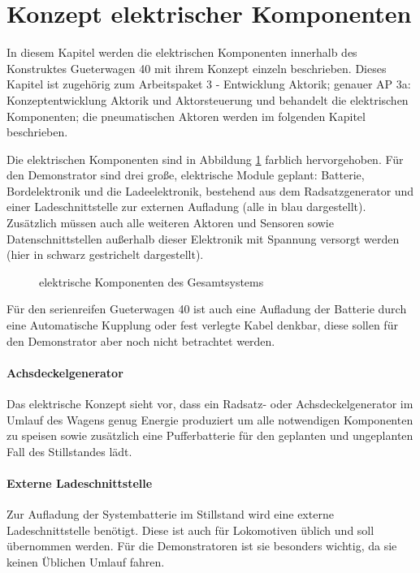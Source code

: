 \section{Konzept elektrischer Komponenten}\label{sec:eKomp}
In diesem Kapitel werden die elektrischen Komponenten innerhalb des Konstruktes \gls{Gueterwagen 40} mit ihrem Konzept einzeln beschrieben. Dieses Kapitel ist zugehörig zum Arbeitspaket 3 - Entwicklung Aktorik; genauer AP 3a: Konzeptentwicklung Aktorik und Aktorsteuerung und behandelt die elektrischen Komponenten; die pneumatischen Aktoren werden im folgenden Kapitel beschrieben.\par
Die elektrischen Komponenten sind in Abbildung \ref{fig:eKomp} farblich hervorgehoben.
Für den \gls{Demonstrator} sind drei große, elektrische Module geplant: Batterie, Bordelektronik und die Ladeelektronik, bestehend aus dem Radsatzgenerator und einer Ladeschnittstelle zur externen Aufladung (alle in blau dargestellt). Zusätzlich müssen auch alle weiteren Aktoren und Sensoren sowie Datenschnittstellen außerhalb dieser Elektronik mit Spannung versorgt werden (hier in schwarz gestrichelt dargestellt).\par
\begin{figure}[hbt]
    \centering
    
    \caption{elektrische Komponenten des Gesamtsystems}
    \label{fig:eKomp}
\end{figure}
Für den serienreifen \gls{Gueterwagen 40} ist auch eine Aufladung der Batterie durch eine Automatische Kupplung oder fest verlegte Kabel denkbar, diese sollen für den \gls{Demonstrator} aber noch nicht betrachtet werden.

\paragraph{Achsdeckelgenerator} \label{sec:RSG}
Das elektrische Konzept sieht vor, dass ein Radsatz- oder Achsdeckelgenerator im Umlauf des Wagens genug Energie produziert um alle notwendigen Komponenten zu speisen sowie zusätzlich eine Pufferbatterie für den geplanten und ungeplanten Fall des Stillstandes lädt.
\paragraph{Externe Ladeschnittstelle}
Zur Aufladung der \gls{Systembatterie} im Stillstand wird eine externe Ladeschnittstelle benötigt. Diese ist auch für Lokomotiven üblich und soll übernommen werden. Für die \gls{Demonstrator}en ist sie besonders wichtig, da sie keinen Üblichen Umlauf fahren.
